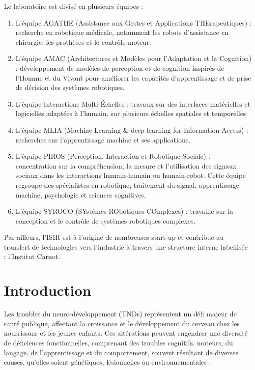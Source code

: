\documentclass[8pt]{article}
\begin{document}
Le laboratoire est divisé en plusieurs équipes :

\begin{enumerate}
    \item L'équipe AGATHE (Assistance aux Gestes et Applications THErapeutiques) : recherche en robotique médicale, notamment les robots d'assistance en chirurgie, les prothèses et le contrôle moteur.
    \item L'équipe AMAC (Architectures et Modèles pour l'Adaptation et la Cognition) : développement de modèles de perception et de cognition inspirés de l'Homme et du Vivant pour améliorer les capacités d'apprentissage et de prise de décision des systèmes robotiques.
    \item L'équipe Interactions Multi-Échelles : travaux sur des interfaces matérielles et logicielles adaptées à l'humain, sur plusieurs échelles spatiales et temporelles.
    \item L'équipe MLIA (Machine Learning \& deep learning for Information Access) : recherches sur l'apprentissage machine et ses applications.
    \item L'équipe PIROS (Perception, Interaction et Robotique Sociale) : concentration sur la compréhension, la mesure et l'utilisation des signaux sociaux dans les interactions humain-humain ou humain-robot. Cette équipe regroupe des spécialistes en robotique, traitement du signal, apprentissage machine, psychologie et sciences cognitives.
    \item L'équipe SYROCO (SYstèmes RObotiques COmplexes) : travaille sur la conception et le contrôle de systèmes robotiques complexes.
\end{enumerate}

Par ailleurs, l'ISIR est à l'origine de nombreuses start-up et contribue au transfert de technologies vers l'industrie à travers une structure interne labellisée : l'Institut Carnot.

\newpage
\pagestyle{fancy}
\setcounter{page}{1}
\section{Introduction}
Les troubles du neuro-développement (TNDs) représentent un défi majeur de santé publique, affectant la croissance et le développement du cerveau chez les nourrissons et les jeunes enfants. Ces altérations peuvent engendrer une diversité de déficiences fonctionnelles, comprenant des troubles cognitifs, moteurs, du langage, de l'apprentissage et du comportement, souvent résultant de diverses causes, qu'elles soient génétiques, lésionnelles ou environnementales \cite{development_americas_nodate}.
\end{document}

